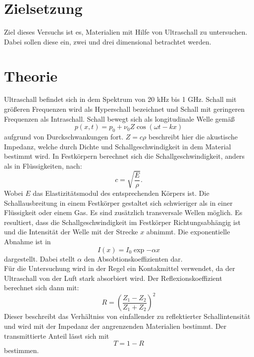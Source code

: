 \section{Zielsetzung}
Ziel dieses Versuchs ist es, Materialien mit Hilfe von Ultraschall zu untersuchen.
Dabei sollen diese ein, zwei und drei dimensional betrachtet werden.
\section{Theorie}
\label{sec:Theorie}
Ultraschall befindet sich in dem Spektrum von 20 kHz bis 1 GHz.
Schall mit größeren Frequenzen wird als Hyperschall bezeichnet und Schall mit geringeren Frequenzen als Intraschall.
Schall bewegt sich als longitudinale Welle gemäß
\begin{equation}
  p(x,t) = p_0 + \nu_0 Z \cos{(\omega t - k x)}
\end{equation}
 aufgrund von Durckschwankungen fort.
 $Z=c \rho$ beschreibt hier die akustische Impedanz, welche durch Dichte und Schallgeschwindigkeit in dem Material bestimmt wird.
 In Festkörpern berechnet sich die Schallgeschwindigkeit, anders als in Flüssigkeiten, nach:
 \begin{equation}
  c=\sqrt{\frac{E}{\rho}}   .
 \end{equation}
Wobei $E$ das Elastizitätsmodul des entsprechenden Körpers ist.
Die Schallausbreitung in einem Festkörper gestaltet sich schwieriger als in einer Flüssigkeit oder einem Gas.
Es sind zusätzlich transversale Wellen möglich.
Es resultiert, dass die Schallgeschwindigkeit im Festkörper Richtungsabhängig ist und die Intensität der Welle mit der Strecke $x$ abnimmt.
Die exponentielle Abnahme ist in
\begin{equation}
  I(x) = I_0 \exp{- \alpha x}
\end{equation}
dargestellt. Dabei stellt $\alpha$ den Absobtionskoeffizienten dar.
\\Für die Untersuchung wird in der Regel ein Kontakmittel verwendet, da der Ultraschall von der Luft stark absorbiert wird.
Der Reflexionskoeffizient berechnet sich dann mit:
\begin{equation}
  R=\left(\frac{Z_1 - Z_2}{Z_1 + Z_2}\right)^2
\end{equation}
Dieser beschreibt das Verhältniss von einfallender zu reflektierter Schallintensität und wird mit der Impedanz der angrenzenden Materialien bestimmt.
Der transmittierte Anteil lässt sich mit
\begin{equation}
  T= 1-R
\end{equation}
bestimmen.
